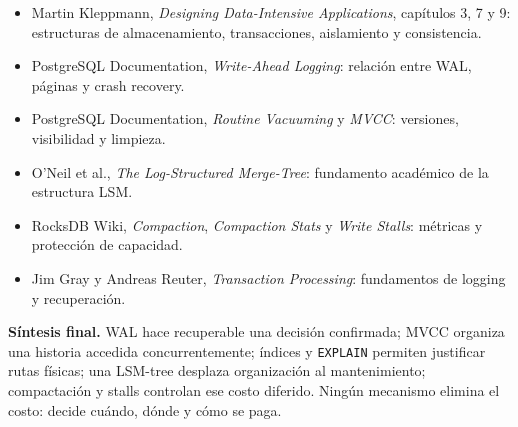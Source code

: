 \documentclass[variant=apuntes,cover=institutional,mode=screen]{ua-engineering-v6-article}
\begin{document}
\begin{itemize}
\item Martin Kleppmann, \emph{Designing Data-Intensive Applications}, capítulos 3, 7 y 9: estructuras de almacenamiento, transacciones, aislamiento y consistencia.
\item PostgreSQL Documentation, \emph{Write-Ahead Logging}: relación entre WAL, páginas y crash recovery.
\item PostgreSQL Documentation, \emph{Routine Vacuuming} y \emph{MVCC}: versiones, visibilidad y limpieza.
\item O'Neil et al., \emph{The Log-Structured Merge-Tree}: fundamento académico de la estructura LSM.
\item RocksDB Wiki, \emph{Compaction}, \emph{Compaction Stats} y \emph{Write Stalls}: métricas y protección de capacidad.
\item Jim Gray y Andreas Reuter, \emph{Transaction Processing}: fundamentos de logging y recuperación.
\end{itemize}

\begin{uakeybox}
\textbf{Síntesis final.} WAL hace recuperable una decisión confirmada; MVCC organiza una historia accedida concurrentemente; índices y \texttt{EXPLAIN} permiten justificar rutas físicas; una LSM-tree desplaza organización al mantenimiento; compactación y stalls controlan ese costo diferido. Ningún mecanismo elimina el costo: decide cuándo, dónde y cómo se paga.
\end{uakeybox}
\end{document}

